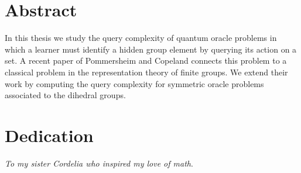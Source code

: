 	

    \tableofcontents

    \chapter*{Abstract}
    In this thesis we study the query complexity of quantum oracle problems in which a learner must identify a 
    hidden group element by querying its action on a set. A recent paper of Pommersheim and Copeland connects this 
    problem to a classical problem in the representation theory of finite groups. We extend their work by computing 
    the query complexity for symmetric oracle problems associated to the dihedral groups.
    
    \chapter*{Dedication}
    \emph{To my sister Cordelia who inspired my love of math}.
  \mainmatter %
  \pagestyle{fancyplain} %

